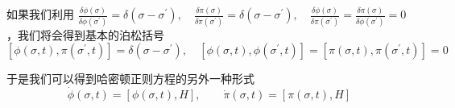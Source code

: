 如果我们利用 $\displaystyle \frac{\delta \phi(\sigma)}{\delta \phi(\sigma^\prime)} = \delta(\sigma - \sigma^\prime),\quad \frac{\delta \pi(\sigma)}{\delta \pi(\sigma^\prime)} = \delta(\sigma - \sigma^\prime),\quad \frac{\delta \phi(\sigma)}{\delta \pi(\sigma^\prime)} = \frac{\delta \pi(\sigma)}{\delta \phi(\sigma^\prime)} = 0$，我们将会得到基本的泊松括号
\begin{equation}
    \left[\phi(\sigma,t),\pi(\sigma^\prime,t)\right] = \delta(\sigma - \sigma^\prime),\quad \left[\phi(\sigma,t),\phi(\sigma^\prime,t)\right] = \left[\pi(\sigma,t),\pi(\sigma^\prime,t)\right] = 0
\end{equation}

于是我们可以得到哈密顿正则方程的另外一种形式
\begin{equation}
    \dot{\phi} (\sigma,t) = \left[\phi(\sigma,t),H\right],\qquad \dot{\pi} (\sigma,t) = \left[\pi(\sigma,t),H\right]
\end{equation}
